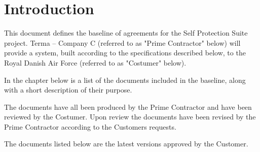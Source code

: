 \documentclass[Main]{subfiles}
\begin{document}
\chapter{Introduction}

This document defines the baseline of agreements for the Self Protection Suite project.
Terma -- Company C (referred to as "Prime Contractor" below) will provide a system, built according to the specifications described below, to the Royal Danish Air Force (referred to as "Costumer" below).

In the chapter below  is  a list of the documents included in the baseline, along with a short description of their purpose.

The documents have all been produced by the Prime Contractor and have been reviewed by the Costumer.
Upon review the documents have been revised by the Prime Contractor according to the Customers requests.

The documents listed below are the latest versions approved by the Customer.
\end{document}
